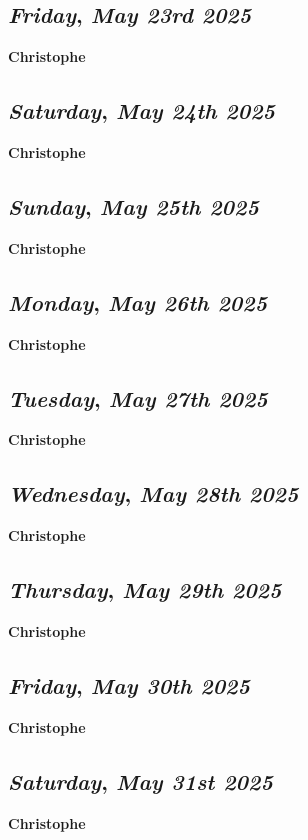 \def\day{\textit{May 23rd 2025}}
\def\weekday{\textit{Friday}}
\subsection*{\weekday, \day}
\textbf {Christophe}

\def\day{\textit{May 24th 2025}}
\def\weekday{\textit{Saturday}}
\subsection*{\weekday, \day}
\textbf {Christophe}

\def\day{\textit{May 25th 2025}}
\def\weekday{\textit{Sunday}}
\subsection*{\weekday, \day}
\textbf {Christophe}

\def\day{\textit{May 26th 2025}}
\def\weekday{\textit{Monday}}
\subsection*{\weekday, \day}
\textbf {Christophe}

\def\day{\textit{May 27th 2025}}
\def\weekday{\textit{Tuesday}}
\subsection*{\weekday, \day}
\textbf {Christophe}

\def\day{\textit{May 28th 2025}}
\def\weekday{\textit{Wednesday}}
\subsection*{\weekday, \day}
\textbf {Christophe}

\def\day{\textit{May 29th 2025}}
\def\weekday{\textit{Thursday}}
\subsection*{\weekday, \day}
\textbf {Christophe}

\def\day{\textit{May 30th 2025}}
\def\weekday{\textit{Friday}}
\subsection*{\weekday, \day}
\textbf {Christophe}

\def\day{\textit{May 31st 2025}}
\def\weekday{\textit{Saturday}}
\subsection*{\weekday, \day}
\textbf {Christophe}
